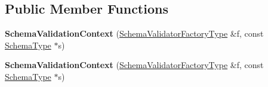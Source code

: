 \subsection*{Public Member Functions}
\begin{DoxyCompactItemize}
\item 
{\bfseries Schema\+Validation\+Context} (\hyperlink{classinternal_1_1_i_schema_state_factory}{Schema\+Validator\+Factory\+Type} \&f, const \hyperlink{classinternal_1_1_schema}{Schema\+Type} $\ast$s)\hypertarget{structinternal_1_1_schema_validation_context_a4adc8f66779626c9da4a56e7a87dcfac}{}\label{structinternal_1_1_schema_validation_context_a4adc8f66779626c9da4a56e7a87dcfac}

\item 
{\bfseries Schema\+Validation\+Context} (\hyperlink{classinternal_1_1_i_schema_state_factory}{Schema\+Validator\+Factory\+Type} \&f, const \hyperlink{classinternal_1_1_schema}{Schema\+Type} $\ast$s)\hypertarget{structinternal_1_1_schema_validation_context_a4adc8f66779626c9da4a56e7a87dcfac}{}\label{structinternal_1_1_schema_validation_context_a4adc8f66779626c9da4a56e7a87dcfac}

\end{DoxyCompactItemize}
